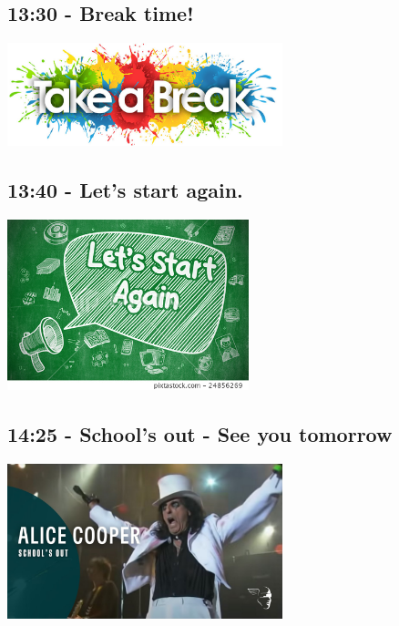 \documentclass[12pt,notes]{beamer}
\begin{document}
\begin{frame}[label={sec:org4e308c6}]{}
\section{13:30 - Break time!}
\begin{center}
\includegraphics[width=8cm]{./img/take_a_break.jpg}
\end{center}
\end{frame}

\begin{frame}[label={sec:org17b0607}]{}
\section{13:40 - Let's start again.}
\begin{center}
\includegraphics[width=7cm]{./img/lets_start_again.jpg}
\end{center}
\end{frame}

\begin{frame}[label={sec:org1bdfb01}]{}
\section{14:25 - School's out - See you tomorrow}

\begin{center}
\includegraphics[width=8cm]{./img/schools_out.jpg}
\end{center}
\end{frame}
\end{document}
